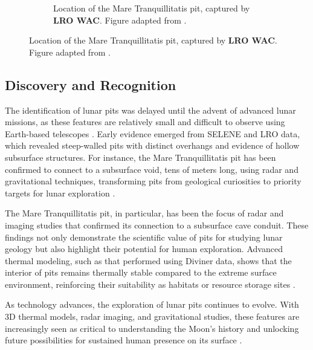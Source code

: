 \begin{figure}[h!]
\begin{subfigure}[c]{0.4\linewidth}
        \caption{Location of the Mare Tranquillitatis pit, captured by \textbf{LRO WAC}. Figure adapted from \cite{sublunear-lava}.}
        \label{fig:image2}
    \end{subfigure}
\end{figure}

\subsection{Discovery and Recognition}
The identification of lunar pits was delayed until the advent of advanced lunar missions, as these features are relatively small and difficult to observe using Earth-based telescopes \cite{lunar-pit-distribution}. Early evidence emerged from SELENE and LRO data, which revealed steep-walled pits with distinct overhangs and evidence of hollow subsurface structures. For instance, the Mare Tranquillitatis pit has been confirmed to connect to a subsurface void, tens of meters long, using radar and gravitational techniques, transforming pits from geological curiosities to priority targets for lunar exploration \cite{Carrer2024, GRAIL, radar-observations-lava-tubes}.

The Mare Tranquillitatis pit, in particular, has been the focus of radar and imaging studies that confirmed its connection to a subsurface cave conduit. These findings not only demonstrate the scientific value of pits for studying lunar geology but also highlight their potential for human exploration. Advanced thermal modeling, such as that performed using Diviner data, shows that the interior of pits remains thermally stable compared to the extreme surface environment, reinforcing their suitability as habitats or resource storage sites \cite{newer-thermal, lunar-pits-entrances-to-caves, thermal-lunar-pits}.

As technology advances, the exploration of lunar pits continues to evolve. With 3D thermal models, radar imaging, and gravitational studies, these features are increasingly seen as critical to understanding the Moon’s history and unlocking future possibilities for sustained human presence on its surface \cite{newer-thermal, radar-observations-lava-tubes, grails-gradients-mariushills}.